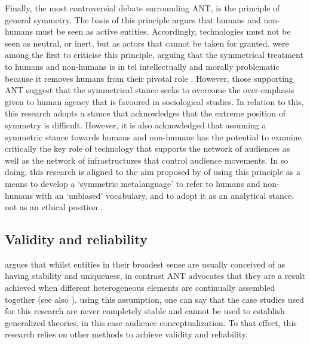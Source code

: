 Finally, the most controversial debate surrounding ANT, is the principle of general symmetry. The basis of this principle argues that humans and non-humans must be seen as active entities. Accordingly, technologies must not be seen as neutral, or inert, but as actors that cannot be taken for granted. \textcite{collins1992epistemological} were among the first to criticise this principle, arguing that the symmetrical treatment to humans and non-humans is in tel intellectually and morally problematic because it removes humans from their pivotal role \cite{munir2004discontinuity, whittle2008actor}. However, those supporting ANT suggest that the symmetrical stance seeks to overcome the over-emphasis given to human agency that is favoured in sociological studies. In relation to this, this research adopts a stance that acknowledges that the extreme position of symmetry is difficult. However, it is also acknowledged that assuming a symmetric stance towards humans and non-humans has the potential to examine critically the key role of technology that supports the network of audiences as well as the network of infrastructures that control audience movements. In so doing, this research is aligned to the aim proposed by \textcite{callon1981unscrewing} of using this principle as a means to develop a ‘symmetric metalanguage’ to refer to humans and non-humans with an ‘unbiased’ vocabulary, and to adopt it as an analytical stance, not as an ethical position \cite{law1992notes}.

\subsection{Validity and reliability}
\textcite{law2002objects} argues that whilst entities in their broadest sense are usually conceived of as having stability and uniqueness, in contrast ANT advocates that they are a result achieved when different heterogeneous elements are continually assembled together (see also \cite{callon1986sociology, law1999after}). using this assumption, one can say that the case studies used for this research are never completely stable and cannot be used to establish generalized theories, in this case audience conceptualization. To that effect, this research relies on other methods to achieve validity and reliability.

